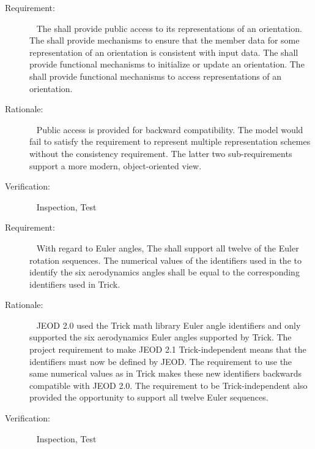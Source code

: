 \label{reqt:data_access}
\begin{description}
\item[Requirement:]\ \newline
  The \ModelDesc shall provide public access to its representations of
  an orientation.
  The \ModelDesc shall provide mechanisms to ensure that the member data
  for some representation of an orientation is consistent with input data.
  The \ModelDesc shall provide functional mechanisms to initialize or update
  an orientation.
  The \ModelDesc shall provide functional mechanisms to access representations
  of an orientation.

\item[Rationale:]\ \newline
  Public access is provided for backward compatibility. The model would
  fail to satisfy the requirement to represent multiple representation schemes
  without the consistency requirement. The latter two sub-requirements support
  a more modern, object-oriented view.

\item[Verification:]\ \newline
  Inspection, Test
\end{description}


\label{reqt:euler_angles}
\begin{description}
\item[Requirement:]\ \newline
  With regard to Euler angles,
    The \ModelDesc shall support all twelve of the Euler rotation sequences.
    The numerical values of the identifiers used in the \ModelDesc to
    identify the six aerodynamics angles shall be equal to the corresponding
    identifiers used in Trick.

\item[Rationale:]\ \newline
  JEOD 2.0 used the Trick math library Euler angle identifiers and only
  supported the six aerodynamics Euler angles supported by Trick.
  The project requirement to make JEOD 2.1 Trick-independent means
  that the identifiers must now be defined by JEOD. The requirement to use the
  same numerical values as in Trick makes these new identifiers backwards
  compatible with JEOD 2.0. The requirement to be Trick-independent also
  provided the opportunity to support all twelve Euler sequences.

\item[Verification:]\ \newline
  Inspection, Test
\end{description}


